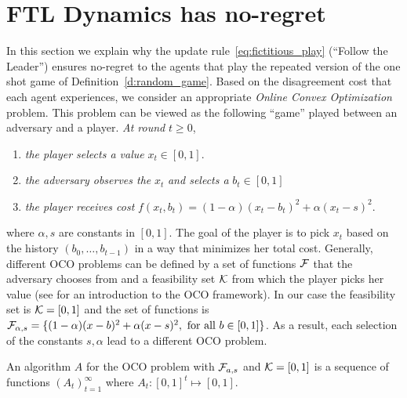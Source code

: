 \section{FTL Dynamics has no-regret}\label{s:fictitious_noregret}
In this section we explain why the
update rule~\ref{eq:fictitious_play} (\enquote{Follow the Leader}) ensures
no-regret to the agents that play the repeated version of the one shot
game of Definition~\ref{d:random_game}.
Based on the disagreement cost that each agent experiences,
we consider an appropriate \emph{Online Convex Optimization} problem.
This problem can be viewed as the following \enquote{game} played between an
adversary and a player. \emph{At round }$t\geq 0$,
\begin{enumerate}
  \item \emph{the player selects a value }$x_t \in [0,1]$.
  \item \emph{the adversary observes the }$x_t$ \emph{and selects a} $b_t \in [0,1]$
  \item \emph{the player receives cost} $f(x_t,b_t)=(1-\alpha)(x_t-b_t)^2 + \alpha(x_t -s)^2$.
\end{enumerate}
where $\alpha,s$ are constants in $[0,1]$. The goal of
the player is to pick $x_t$ based on the history
$(b_0,\ldots,b_{t-1})$ in a way that minimizes her total cost.
Generally, different OCO problems can be defined by a set of functions
$\mathcal{F}$ that the adversary chooses from and a feasibility
set $\mathcal{K}$ from which the player picks her value (see \cite{Haz16}
for an introduction to the OCO framework).
In our case the feasibility set is $\mathcal{K}=[0,1]$ and the set of functions is $\mathcal{F}_{\alpha,s} = \{(1-\alpha)(x-b)^2 +
\alpha(x -s)^2,~\text{for all }b \in [0,1]\}$.
As a result, each selection of the
constants $s,\alpha$ lead to a different OCO problem.

\begin{definition}\label{d:OCO_algo}
An algorithm $A$ for the OCO problem with $\mathcal{F}_{a,s}$ and
$\mathcal{K}=[0,1]$ is a sequence of functions $(A_t)_{t=1}^\infty$ where $A_t:[0,1]^t \mapsto [0,1]$.
\end{definition}

